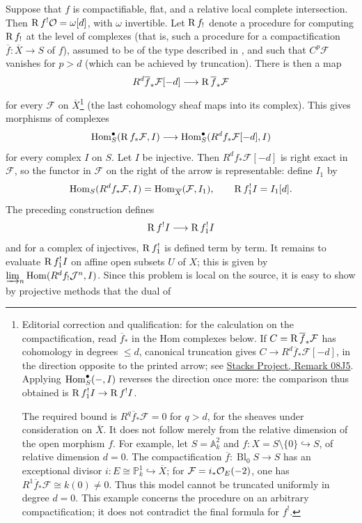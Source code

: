 Suppose that $f$ is compactifiable, flat, and a relative local complete intersection. Then $\operatorname{R} f^!\mathcal O=\omega[d]$, with $\omega$ invertible. Let $\operatorname{R} f_!$ denote a procedure for computing $\operatorname{R} f_!$ at the level of complexes (that is, such a procedure for a compactification $\overline f:\overline X\to S$ of $f$), assumed to be of the type described in , and such that $C^p\mathcal F$ vanishes for $p>d$ (which can be achieved by truncation). There is then a map
\[
R^{d}\overline{f}_{*}\mathcal{F}[-d]
 \longrightarrow \operatorname{R}\overline{f}_{*}\mathcal{F}
\]
for every $\mathcal F$ on $\overline X$\footnote{Editorial correction and qualification: for the calculation on the compactification, read $\overline f_*$ in the Hom complexes below. If $C=\operatorname{R}\overline f_*\mathcal F$ has cohomology in degrees $\le d$, canonical truncation gives $C\to R^d\overline f_*\mathcal F[-d]$, in the direction opposite to the printed arrow; see \href{https://stacks.math.columbia.edu/tag/08J5}{Stacks Project, Remark 08J5}. Applying $\operatorname{Hom}_S^{\bullet}(-,I)$ reverses the direction once more: the comparison thus obtained is $\operatorname{R} f_1^!I\to\operatorname{R} f^!I$.
\par The required bound is $R^q\overline f_*\mathcal F=0$ for $q>d$, for the sheaves under consideration on $\overline X$. It does not follow merely from the relative dimension of the open morphism $f$. For example, let $S=\mathbb A_k^2$ and $f:X=S\setminus\{0\}\hookrightarrow S$, of relative dimension $d=0$. The compactification $\overline f:\operatorname{Bl}_0 S\to S$ has an exceptional divisor $i:E\cong\mathbb P_k^1\hookrightarrow\overline X$; for $\mathcal F=i_*\mathcal{O}_E(-2)$, one has $R^1\overline f_*\mathcal F\cong k(0)\ne0$. Thus this model cannot be truncated uniformly in degree $d=0$. This example concerns the procedure on an arbitrary compactification; it does not contradict the final formula for $f^!$.} (the last cohomology sheaf maps into its complex). This gives morphisms of complexes
\[
\operatorname{Hom}_{S}^{\bullet}(\operatorname{R} f_{*}\mathcal{F}, I)
 \longrightarrow
\operatorname{Hom}_{S}^{\bullet}(R^{d}f_{*}\mathcal{F}[-d], I)
\]
for every complex $I$ on $S$. Let $I$ be injective. Then $R^d f_*\mathcal F[-d]$ is right exact in $\mathcal F$, so the functor in $\mathcal F$ on the right of the arrow is representable: define $I_1$ by
\[
\operatorname{Hom}_{S}(R^{d}f_{*}\mathcal{F}, I)
 = \operatorname{Hom}_{\overline X}(\mathcal{F}, I_1),
 \qquad \operatorname{R} f_{1}^{!}I = I_1[d].
\]
The preceding construction defines
\[
\operatorname{R} f^{!}I \longrightarrow \operatorname{R} f_{1}^{!}I
\]
and for a complex of injectives, $\operatorname{R} f_1^!$ is defined term by term. It remains to evaluate $\operatorname{R} f_1^!I$ on affine open subsets $U$ of $X$; this is given by $\varinjlim_n\operatorname{Hom}(R^d f_!\mathcal J^n,I)$. Since this problem is local on the source, it is easy to show by projective methods that the dual of

